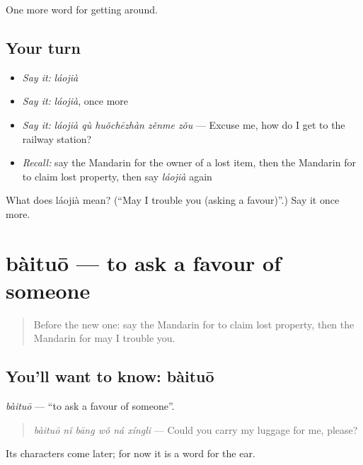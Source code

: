 \begin{grammarlens}[title={What you've built}]
One more word for getting around.
\end{grammarlens}

\subsection*{Your turn}
\begin{itemize}
\raggedright
  \item \emph{Say it:} \emph{láojià}
  \item \emph{Say it:} \emph{láojià}, once more
  \item \emph{Say it:} \emph{láojià qù huǒchēzhàn zěnme zǒu} — Excuse me, how do I get to the railway station?
  \item \emph{Recall:} say the Mandarin for the owner of a lost item, then the Mandarin for to claim lost property, then say \emph{láojià} again
\end{itemize}

\begin{tcolorbox}[breakable,colback=teal!4,colframe=teal!35!black,title={Before you move on}]
What does láojià mean? (\textquotedblleft{}May I trouble you (asking a favour)\textquotedblright{}.) Say it once more.
\end{tcolorbox}
\section[bàituō]{bàituō — to ask a favour of someone}

\label{lesson:ZH-C457-baituo}



\begin{quote}
Before the new one: say the Mandarin for to claim lost property, then the Mandarin for may I trouble you.
\end{quote}

\subsection*{You'll want to know: bàituō}
\emph{bàituō} — \textquotedblleft{}to ask a favour of someone\textquotedblright{}.

\begin{quote}
\emph{bàituō nǐ bāng wǒ ná xíngli} — Could you carry my luggage for me, please?
\end{quote}

Its characters come later; for now it is a word for the ear.

